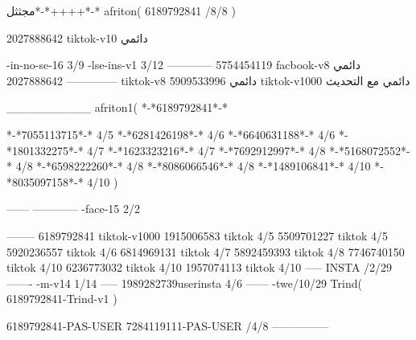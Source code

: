 مجثثل*-*++++*-*
afriton(
6189792841 /8/8
)

2027888642 tiktok-v10
دائمي

-in-no-se-16 3/9
-lse-ins-v1 3/12
------------
5754454119 facbook-v8
دائمي
--------------
2027888642 tiktok-v8
دائمي
5909533996 tiktok-v1000
دائمي مع التحديث

__________
afriton1(
*-*6189792841*-*

*-*7055113715*-* 4/5
*-*6281426198*-* 4/6
*-*6640631188*-* 4/6
*-*1801332275*-* 4/7
*-*1623323216*-* 4/7
*-*7692912997*-* 4/8
*-*5168072552*-* 4/8
*-*6598222260*-* 4/8
*-*8086066546*-* 4/8
*-*1489106841*-* 4/10
*-*8035097158*-* 4/10
)


------
------------
-face-15 2/2

--------
6189792841 tiktok-v1000
1915006583 tiktok 4/5
5509701227 tiktok 4/5
5920236557 tiktok 4/6
6814969131 tiktok 4/7
5892459393 tiktok 4/8
7746740150 tiktok 4/10
6236773032 tiktok 4/10
1957074113 tiktok 4/10
-----
 INSTA /2/29
-------
-m-v14 1/14
-----
1989282739userinsta 4/6
------
-twe/10/29
Trind(
6189792841-Trind-v1 
)

6189792841-PAS-USER
7284119111-PAS-USER /4/8
    ---------------
